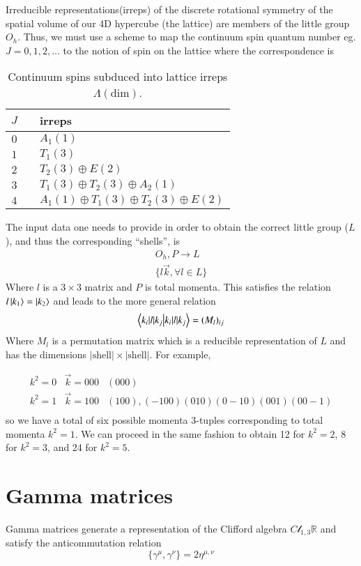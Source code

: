  Irreducible representations(irreps) of the discrete rotational symmetry of the spatial volume of our 4D hypercube (the lattice) are members of the little group $O_h$. Thus, we must use a scheme to map the continuum spin quantum number eg. $J=0,1,2,\dots$ to the notion of spin on the lattice where the correspondence is \cite{Dudek_2010}
\begin{table}
    \begin{tabular}{ccl}
    $J$ & & irreps \\
    \hline
    $0$ & & $A_1(1)$ \\
    $1$ & & $T_1(3)$ \\
    $2$ & & $T_2(3) \oplus E(2)$\\
    $3$ & & $T_1(3) \oplus T_2(3) \oplus A_2(1)$\\
    $4$ & & $A_1(1) \oplus T_1(3) \oplus T_2(3) \oplus E(2)$
\end{tabular}
\caption{Continuum spins subduced into lattice irreps $\Lambda(\mathrm{dim})$.}
\label{Table:Subduce}
\end{table}
    
The input data one needs to provide in order to obtain the correct little group ($L$), and thus the corresponding ``shells'', is 
\begin{align}
    O_h,P \rightarrow L \\
    \{l\vec{k}, \forall l \in L\}
\end{align}
Where $l$ is a $3\times3$ matrix and $P$ is total momenta. This satisfies the relation $l\ket{k_1} = \ket{k_2}$ and leads to the more general relation 
\begin{align}
    \braket{k_i|l|k_j} = (M_l)_{ij}
\end{align} 
Where $M_l$ is a permutation matrix which is a reducible representation of $L$ and has the dimensions $|\text{shell}| \times |\text{shell}|$. For example, 

\begin{align}
    k^2 = 0 & \vec{k} = 000 & {(000)} \\
    k^2 = 1 & \vec{k}=100 & {(100),(-100)(010)(0-10)(001)(00-1)} \\
\end{align} so we have a total of six possible momenta 3-tuples corresponding to total momenta $k^2 =1$. We can proceed in the same fashion to obtain 12 for $k^2 =2$, 8 for $k^2=3$, and 24 for $k^2=5$. 


\section{Gamma matrices}
Gamma matrices generate a representation of the Clifford algebra $C\mathcal{l}_{1,3}\mathbb{R}$ and satisfy the anticommutation relation 
\begin{equation}
    \{\gamma^\mu,\gamma^\nu \} = 2\eta^{\mu,\nu}
\end{equation}

